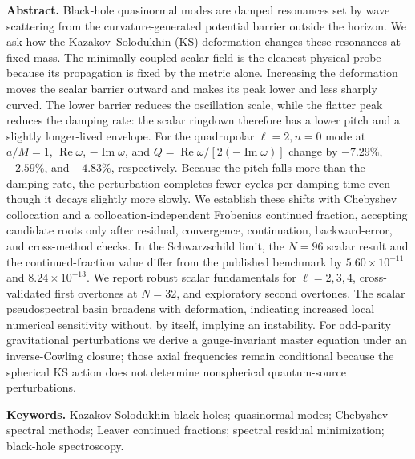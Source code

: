 \documentclass[12pt,a4paper]{article}
\begin{document}
\begin{center}
\begin{minipage}{0.92\textwidth}
\small
\noindent\textbf{Abstract.}
Black-hole quasinormal modes are damped resonances set by wave scattering from
the curvature-generated potential barrier outside the horizon.  We ask how the
Kazakov--Solodukhin (KS) deformation changes these resonances at fixed mass.
The minimally coupled scalar field is the cleanest physical probe because its
propagation is fixed by the metric alone.  Increasing the deformation moves
the scalar barrier outward and makes its peak lower and less sharply curved.
The lower barrier reduces the oscillation scale, while the flatter peak
reduces the damping rate: the scalar ringdown therefore has a lower pitch and
a slightly longer-lived envelope.  For the quadrupolar \(\ell=2,n=0\) mode at
\(a/M=1\), \(\operatorname{Re}\omega\), \(-\operatorname{Im}\omega\), and
\(Q=\operatorname{Re}\omega/[2(-\operatorname{Im}\omega)]\) change by
\(-7.29\%\), \(-2.59\%\), and \(-4.83\%\), respectively.  Because the pitch
falls more than the damping rate, the perturbation completes fewer cycles per
damping time even though it decays slightly more slowly.  We establish these
shifts with Chebyshev collocation and a collocation-independent Frobenius
continued fraction, accepting candidate roots only after residual,
convergence, continuation, backward-error, and cross-method checks.  In the
Schwarzschild limit, the \(N=96\) scalar result and the continued-fraction
value differ from the published benchmark by \(5.60\times10^{-11}\) and
\(8.24\times10^{-13}\).  We report robust scalar fundamentals for
\(\ell=2,3,4\), cross-validated first overtones at \(N=32\), and exploratory
second overtones.  The scalar pseudospectral basin broadens with deformation,
indicating increased local numerical sensitivity without, by itself, implying
an instability.
For odd-parity gravitational perturbations we derive a gauge-invariant master
equation under an inverse-Cowling closure; those axial frequencies remain
conditional because the spherical KS action does not determine nonspherical
quantum-source perturbations.

\vspace{0.65em}
\noindent\textbf{Keywords.}
Kazakov-Solodukhin black holes; quasinormal modes; Chebyshev spectral methods; Leaver continued fractions; spectral residual minimization; black-hole spectroscopy.
\end{minipage}
\end{center}
\vspace{1.0em}
\begingroup
\renewcommand{\thefootnote}{*}
\endgroup
\thispagestyle{empty}
\end{document}
